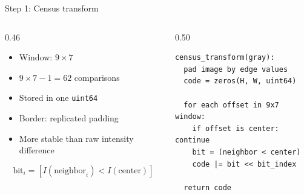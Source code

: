 \documentclass[aspectratio=169,11pt]{beamer}
\newcommand{\code}[1]{\texttt{#1}}
\begin{document}
\begin{frame}[fragile]{Step 1: Census transform}
\begin{columns}[T,totalwidth=\textwidth]
\begin{column}{0.46\textwidth}
\begin{itemize}
    \item Window: \textbf{$9\times7$}
    \item $9\times7-1=62$ comparisons
    \item Stored in one \code{uint64}
    \item Border: replicated padding
    \item More stable than raw intensity difference
\end{itemize}
\vspace{0.3em}
\[
\text{bit}_i=[I(\text{neighbor}_i)<I(\text{center})]
\]
\end{column}
\begin{column}{0.50\textwidth}
\scriptsize
\begin{verbatim}
census_transform(gray):
  pad image by edge values
  code = zeros(H, W, uint64)

  for each offset in 9x7 window:
    if offset is center: continue
    bit = (neighbor < center)
    code |= bit << bit_index

  return code
\end{verbatim}
\end{column}
\end{columns}
\end{frame}


\end{document}
